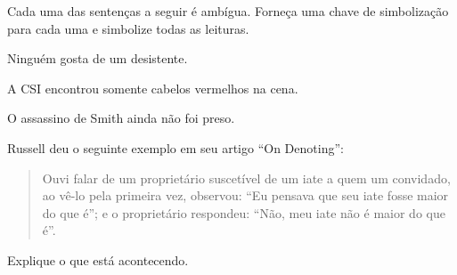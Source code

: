 \practiceproblems
\problempart
Cada uma das sentenças a seguir é ambígua. Forneça uma chave de simbolização para cada uma e simbolize todas as leituras.
\begin{compactlist}
\item Ninguém gosta de um desistente.
\item A CSI encontrou somente cabelos vermelhos na cena.
\item O assassino de Smith ainda não foi preso.
\end{compactlist}

\problempart
Russell deu o seguinte exemplo em seu artigo \textquotedblleft On Denoting\textquotedblright{}:
\begin{quote}
Ouvi falar de um proprietário suscetível de um iate a quem um convidado, ao vê-lo pela primeira vez, observou: \textquotedblleft Eu pensava que seu iate fosse maior do que é\textquotedblright{}; e o proprietário respondeu: \textquotedblleft Não, meu iate não é maior do que é\textquotedblright{}.
\end{quote}
Explique o que está acontecendo.
